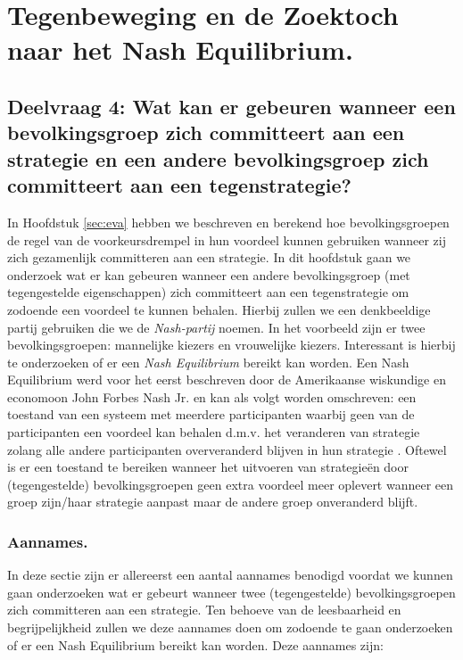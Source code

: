 \newpage
\section{Tegenbeweging en de Zoektoch naar het Nash Equilibrium.}
\label{h7}

\subsection*{Deelvraag 4: Wat kan er gebeuren wanneer een bevolkingsgroep zich committeert aan een strategie en een andere bevolkingsgroep zich committeert aan een tegenstrategie?}


In Hoofdstuk \ref{sec:eva} hebben we beschreven en berekend hoe bevolkingsgroepen de regel van de voorkeursdrempel in hun voordeel kunnen gebruiken wanneer zij zich gezamenlijk committeren aan een strategie. In dit hoofdstuk gaan we onderzoek wat er kan gebeuren wanneer een andere bevolkingsgroep (met tegengestelde eigenschappen) zich committeert aan een tegenstrategie om zodoende een voordeel te kunnen behalen. Hierbij zullen we een denkbeeldige partij gebruiken die we de \textit{Nash-partij} noemen. In het voorbeeld zijn er twee bevolkingsgroepen: mannelijke kiezers en vrouwelijke kiezers. Interessant is hierbij te onderzoeken of er een \textit{Nash Equilibrium} bereikt kan worden. Een Nash Equilibrium werd voor het eerst beschreven door de Amerikaanse wiskundige en economoon John Forbes Nash Jr. \cite{nash1950equilibrium} en kan als volgt worden omschreven: een toestand van een systeem met meerdere participanten waarbij geen van de participanten een voordeel kan behalen d.m.v. het veranderen van strategie zolang alle andere participanten oververanderd blijven in hun strategie \citep{christiansen2016neuroeconomics, nashprinceton}. Oftewel is er een toestand te bereiken wanneer het uitvoeren van strategie\"{e}n door (tegengestelde) bevolkingsgroepen geen extra voordeel meer oplevert wanneer een groep zijn/haar strategie aanpast maar de andere groep onveranderd blijft. 

\subsubsection*{Aannames.} \label{aannamesNash}
In deze sectie zijn er allereerst een aantal aannames benodigd voordat we kunnen gaan onderzoeken wat er gebeurt wanneer twee (tegengestelde) bevolkingsgroepen zich committeren aan een strategie. Ten behoeve van de leesbaarheid en begrijpelijkheid zullen we deze aannames doen om zodoende te gaan onderzoeken of er een Nash Equilibrium bereikt kan worden. Deze aannames zijn:

